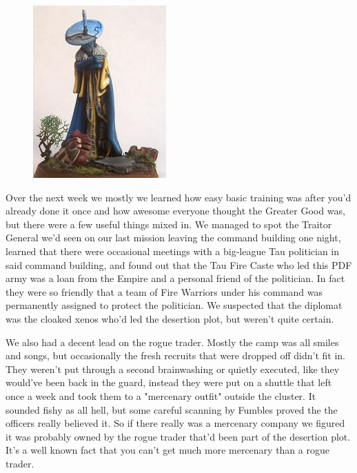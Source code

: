 \begin{figure}
	\begin{center}
		\includegraphics[width=\figwidth]{pics/10/46.png}
	\end{center}
\end{figure}
Over the next week we mostly we learned how easy basic training was after you'd already done it once and how awesome everyone thought the Greater Good was, but there were a few useful things mixed in. 
We managed to spot the Traitor General we'd seen on our last mission leaving the command building one night, learned that there were occasional meetings with a big-league Tau politician in said command building, and found out that the Tau Fire Caste who led this PDF army was a loan from the Empire and a personal friend of the politician. 
In fact they were so friendly that a team of Fire Warriors under his command was permanently assigned to protect the politician. 
We suspected that the diplomat was the cloaked xenos who'd led the desertion plot, but weren't quite certain.

We also had a decent lead on the rogue trader. 
Mostly the camp was all smiles and songs, but occasionally the fresh recruits that were dropped off didn't fit in. 
They weren't put through a second brainwashing or quietly executed, like they would've been back in the guard, instead they were put on a shuttle that left once a week and took them to a "mercenary outfit" outside the cluster. 
It sounded fishy as all hell, but some careful scanning by Fumbles proved the the officers really believed it. 
So if there really was a mercenary company we figured it was probably owned by the rogue trader that'd been part of the desertion plot. 
It's a well known fact that you can't get much more mercenary than a rogue trader.


